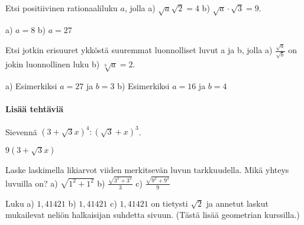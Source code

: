 \begin{tehtavasivu}
\begin{tehtava}
\begin{vastaus}
\end{vastaus}
\end{tehtava}

\begin{tehtava} Etsi positiivinen rationaaliluku $a$, jolla
a) $\sqrt{a} \sqrt{2} = 4$  \quad b)   $ \sqrt{a}\cdot{\sqrt{3}} =9 $.   \quad 
\begin{vastaus}
a) $a=8$ \quad b) $a=27$ \quad 
\end{vastaus}
\end{tehtava}


\begin{tehtava} Etsi jotkin erisuuret ykköstä suuremmat luonnolliset luvut a ja b, jolla 
a) $\frac{\sqrt{a}}{\sqrt{b}}$ on jokin luonnollinen luku  \quad b) $\sqrt[b]{a}=2$.   
\begin{vastaus}
a) Esimerkiksi $a=27$ \quad ja \quad $b=3$  \quad b) Esimerkiksi $a=16$ \quad ja \quad $b=4$ 
\end{vastaus}
\end{tehtava}



\paragraph*{Lisää tehtäviä}

\begin{tehtava}
Sievennä $(3+\sqrt{3}x)^4:(\sqrt{3}+x)^3$.
\begin{vastaus}
$9(3 + \sqrt{3}x)$
\end{vastaus}
\end{tehtava}

\begin{tehtava} Laske laskimella likiarvot viiden merkitsevän luvun tarkkuudella. Mikä yhteys luvuilla on?
a) $ \sqrt{1^2+1^2}$ \quad b)  $ \frac {\sqrt{3^2+3^2}}{3}$    \quad c)  $ \frac {\sqrt{9^2+9^2}}{9}$  \quad 
\begin{vastaus}
Luku a) $1,41421$ \quad b) $1,41421$ \quad c) $1,41421$ on tietysti $\sqrt{2}$ ja annetut laskut mukailevat neliön halkaisijan suhdetta sivuun. (Tästä lisää geometrian kurssilla.) %
\end{vastaus}
\end{tehtava}


\end{tehtavasivu}
